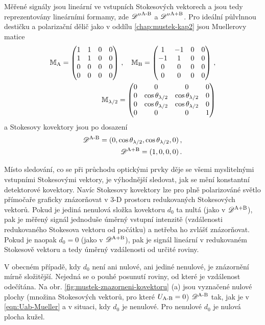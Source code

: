 Měřené signály jsou lineární ve vstupních Stokesových vektorech a jsou tedy reprezentovány lineárními formamy, zde ${\mathscr{D}''}^\textrm{A-B}$ a ${\mathscr{D}''}^\textrm{A+B}$.
Pro ideální půlvlnnou destičku a polarizační dělič jako v oddílu \ref{chap:mustek-kap2} jsou Muellerovy matice
\begin{align}
    \mathbb{M}_\textrm{A} = \begin{pmatrix} 1&1&0&0 \\ 1&1&0&0 \\ 0&0&0&0 \\ 0&0&0&0 \end{pmatrix} \,,\quad 
    \mathbb{M}_\textrm{B} = \begin{pmatrix} 1&-1&0&0 \\ -1&1&0&0 \\ 0&0&0&0 \\ 0&0&0&0 \end{pmatrix} \,, \\
    \mathbb{M}_{\lambda/2} = \begin{pmatrix} 0&0&0&0 \\ 0&\cos\theta_{\lambda/2}&\cos\theta_{\lambda/2}&0 \\ 0&\cos\theta_{\lambda/2}&\cos\theta_{\lambda/2}&0 \\ 0&0&0&1 \end{pmatrix}
\end{align}
a Stokesovy kovektory jsou po dosazení
\begin{align}
    \mathscr{D}^\textrm{A-B}=(0, \cos\theta_{\lambda/2}, \cos\theta_{\lambda/2}, 0) \,, \label{eqn:Uab-Mueller} \\
    \mathscr{D}^\textrm{A+B}=(1, 0, 0, 0) \,.
\end{align}

Místo sledování, co se při průchodu optickými prvky děje se všemi myslitelnými vstupními Stokesovými vektory, je výhodnější sledovat, jak se mění konstantní detektorové kovektory.
Navíc Stokesovy kovektory lze pro plně polarizováné světlo přímočaře graficky znázorňovat v 3-D prostoru redukovaných Stokesových vektorů.
Pokud je jediná nenulová složka kovektoru $d_0$ ta nultá (jako v $\mathscr{D}^\textrm{A+B}$), pak je měřený signál jednoduše úměrný vstupní intenzitě (vzdálenosti redukovaného Stokesova vektoru od počátku) a netřeba ho zvlášť znázorňovat.
Pokud je naopak $d_0=0$ (jako v $\mathscr{D}^\textrm{A+B}$), pak je signál lineární v redukovaném Stokesově vektoru a tedy úměrný vzdálenosti od určité roviny.

V obecném případě, kdy $d_0$ není ani nulové, ani jediné nenulové, je znázornění mírně složitější.
Nejedná se o pouhé posunutí roviny, od které je vzdálenost odečítána.
Na obr. \ref{fig:mustek-znazorneni-kovektoru} (a) jsou vyznačené nulové plochy (množina Stokesových vektorů, pro které $U_\textrm{A-B}=0$) $\mathscr{D}^\textrm{A-B}$ tak, jak je v \eqref{eqn:Uab-Mueller} a v situaci, kdy $d_0$ je nenulové.
Pro nenulové $d_0$ je nulová plocha kužel.

